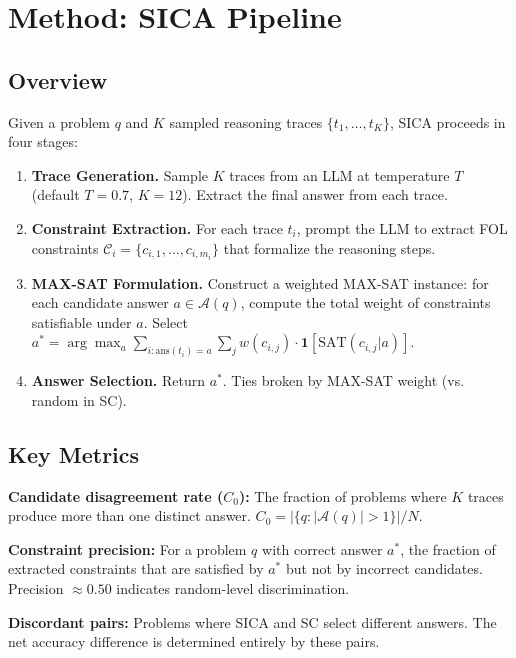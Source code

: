 \documentclass[11pt,a4paper]{article}
\begin{document}
\section{Method: SICA Pipeline}

\subsection{Overview}

Given a problem $q$ and $K$ sampled reasoning traces $\{t_1, \ldots, t_K\}$, SICA proceeds in four stages:

\begin{enumerate}
\item \textbf{Trace Generation.} Sample $K$ traces from an LLM at temperature $T$ (default $T{=}0.7$, $K{=}12$). Extract the final answer from each trace.
\item \textbf{Constraint Extraction.} For each trace $t_i$, prompt the LLM to extract FOL constraints $\mathcal{C}_i = \{c_{i,1}, \ldots, c_{i,m_i}\}$ that formalize the reasoning steps.
\item \textbf{MAX-SAT Formulation.} Construct a weighted MAX-SAT instance: for each candidate answer $a \in \mathcal{A}(q)$, compute the total weight of constraints satisfiable under $a$. Select $a^* = \arg\max_{a} \sum_{i: \text{ans}(t_i)=a} \sum_j w(c_{i,j}) \cdot \mathbf{1}[\text{SAT}(c_{i,j} | a)]$.
\item \textbf{Answer Selection.} Return $a^*$. Ties broken by MAX-SAT weight (vs. random in SC).
\end{enumerate}

\subsection{Key Metrics}

\textbf{Candidate disagreement rate ($C_0$):} The fraction of problems where $K$ traces produce more than one distinct answer. $C_0 = |\{q : |\mathcal{A}(q)| > 1\}| / N$.

\textbf{Constraint precision:} For a problem $q$ with correct answer $a^*$, the fraction of extracted constraints that are satisfied by $a^*$ but not by incorrect candidates. Precision $\approx 0.50$ indicates random-level discrimination.

\textbf{Discordant pairs:} Problems where SICA and SC select different answers. The net accuracy difference is determined entirely by these pairs.
\end{document}
